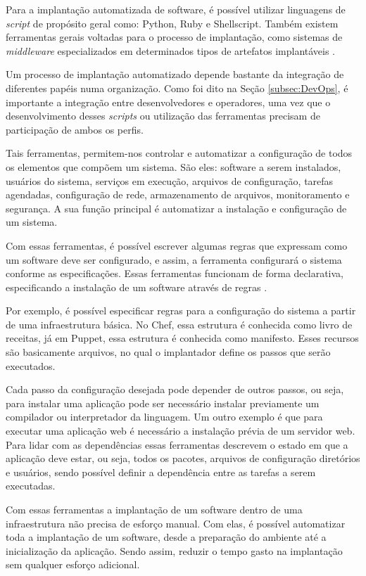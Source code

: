 Para a implantação automatizada de software, é
possível utilizar linguagens de \textit{script} de propósito
geral como: Python, Ruby e Shellscript. Também existem ferramentas gerais 
voltadas para o processo de implantação, como sistemas de \textit{middleware} 
especializados em determinados tipos de artefatos implantáveis \cite{leo2014}.

Um processo de implantação automatizado depende bastante da integração de diferentes papéis
numa organização. Como foi dito na Seção \ref{subsec:DevOps}, é importante a
integração entre desenvolvedores e operadores, uma vez que o desenvolvimento desses
\textit{scripts} ou utilização das ferramentas precisam de participação de ambos os perfis.

Tais ferramentas, permitem-nos controlar e automatizar a configuração de todos os 
elementos que compõem um sistema. São eles: software a serem instalados,
usuários do sistema, serviços em execução, arquivos de configuração, tarefas agendadas,
configuração de rede, armazenamento de arquivos, monitoramento e segurança. A sua 
função principal é automatizar a instalação e configuração de um 
sistema. 

Com essas ferramentas, é possível escrever algumas regras que expressam como 
um software deve ser configurado, e assim, a ferramenta configurará o sistema conforme as 
especificações. Essas ferramentas funcionam de forma declarativa, 
especificando a instalação de um software através de regras \cite{6265084}.

Por exemplo, é possível especificar regras para a configuração do sistema
a partir de uma infraestrutura básica. No Chef, essa estrutura é conhecida como livro
de receitas, já em Puppet, essa estrutura é conhecida como manifesto. Esses recursos
são basicamente arquivos, no qual o implantador define os passos que serão executados. 

Cada passo da configuração desejada pode depender de outros passos, ou seja, para
instalar uma aplicação pode ser necessário instalar previamente um compilador ou interpretador
 da linguagem. Um outro exemplo é que para executar uma aplicação web é necessário a 
instalação prévia de um servidor web. Para lidar com as dependências essas 
ferramentas descrevem o estado em que a aplicação deve estar, ou seja, 
todos os pacotes, arquivos de configuração diretórios e usuários, sendo possível 
definir a dependência entre as tarefas a serem executadas.

Com essas ferramentas a implantação de um software dentro de uma infraestrutura
não precisa de esforço manual. Com elas, é possível automatizar toda a implantação
de um software, desde a preparação do ambiente até a inicialização da aplicação. 
Sendo assim, reduzir o tempo gasto na implantação sem qualquer esforço
adicional.

